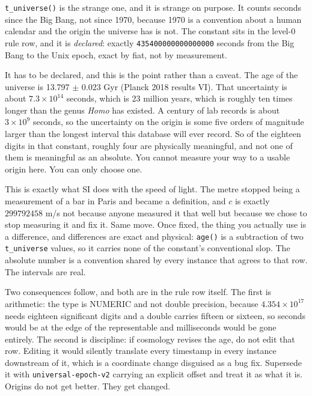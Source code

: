 \verb|t_universe()| is the strange one, and it is strange on purpose. It counts seconds since the Big Bang, not since 1970, because 1970 is a convention about a human calendar and the origin the universe has is not. The constant sits in the level-0 rule row, and it is \emph{declared}: exactly \verb|435400000000000000| seconds from the Big Bang to the Unix epoch, exact by fiat, not by measurement.

It has to be declared, and this is the point rather than a caveat. The age of the universe is 13.797 $\pm$ 0.023 Gyr (Planck 2018 results VI). That uncertainty is about $7.3 \times 10^{14}$ seconds, which is 23 million years, which is roughly ten times longer than the genus \emph{Homo} has existed. A century of lab records is about $3 \times 10^{9}$ seconds, so the uncertainty on the origin is some five orders of magnitude larger than the longest interval this database will ever record. So of the eighteen digits in that constant, roughly four are physically meaningful, and not one of them is meaningful as an absolute. You cannot measure your way to a usable origin here. You can only choose one.

This is exactly what SI does with the speed of light. The metre stopped being a measurement of a bar in Paris and became a definition, and $c$ is exactly $299792458$ m/s not because anyone measured it that well but because we chose to stop measuring it and fix it. Same move. Once fixed, the thing you actually use is a difference, and differences are exact and physical: \verb|age()| is a subtraction of two \verb|t_universe| values, so it carries none of the constant's conventional slop. The absolute number is a convention shared by every instance that agrees to that row. The intervals are real.

Two consequences follow, and both are in the rule row itself. The first is arithmetic: the type is NUMERIC and not double precision, because $4.354 \times 10^{17}$ needs eighteen significant digits and a double carries fifteen or sixteen, so seconds would be at the edge of the representable and milliseconds would be gone entirely. The second is discipline: if cosmology revises the age, do not edit that row. Editing it would silently translate every timestamp in every instance downstream of it, which is a coordinate change disguised as a bug fix. Supersede it with \verb|universal-epoch-v2| carrying an explicit offset and treat it as what it is. Origins do not get better. They get changed.

